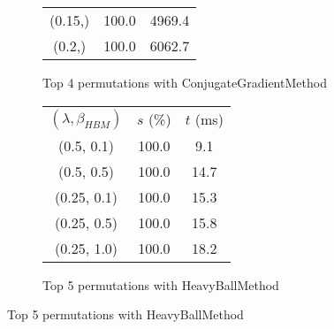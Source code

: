 \begin{figure}[H]
{\begin{subfigure}[ht]{.6\textwidth}
\begin{tabular}{|c|c|c|}
(0.15,) & 100.0 & 4969.4 \\
(0.2,) & 100.0 & 6062.7 \\
\hline
\end{tabular}
\caption{Top 4 permutations with ConjugateGradientMethod}
\label{subfig:param_comp_NegativeEntropy_ConjugateGradientMethod_ConstantSearch}
\end{subfigure}
\hfill
\begin{subfigure}[ht]{.6\textwidth}
\centering
{}
\begin{tabular}{|c|c|c|}
\hline
\rowcolor{gray!25}
\multicolumn{3}{|c|}{HeavyBallMethod} \\
\hline
\rowcolor{gray!25}
$(\lambda,\beta_{HBM})$ & $s$ (\%) & $t$ (ms) \\
\hline
(0.5, 0.1) & 100.0 & 9.1 \\
(0.5, 0.5) & 100.0 & 14.7 \\
(0.25, 0.1) & 100.0 & 15.3 \\
(0.25, 0.5) & 100.0 & 15.8 \\
(0.25, 1.0) & 100.0 & 18.2 \\
\hline
\end{tabular}
\caption{Top 5 permutations with HeavyBallMethod}
\label{subfig:param_comp_NegativeEntropy_HeavyBallMethod_ConstantSearch}
\end{subfigure}
}
\end{figure}